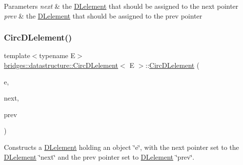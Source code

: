 \begin{DoxyParams}{Parameters}
{\em next} & the \mbox{\hyperlink{classbridges_1_1datastructure_1_1_d_lelement}{D\+Lelement}} that should be assigned to the next pointer \\
\hline
{\em prev} & the \mbox{\hyperlink{classbridges_1_1datastructure_1_1_d_lelement}{D\+Lelement}} that should be assigned to the prev pointer \\
\hline
\end{DoxyParams}
\mbox{\label{classbridges_1_1datastructure_1_1_circ_d_lelement_a52b304df48ac1ba5a13b4c3c596f433b}} 
\subsubsection{\texorpdfstring{CircDLelement()}{CircDLelement()}\hspace{0.1cm}{\footnotesize\ttfamily [4/4]}}
{\footnotesize\ttfamily template$<$typename E$>$ \\
\mbox{\hyperlink{classbridges_1_1datastructure_1_1_circ_d_lelement}{bridges\+::datastructure\+::\+Circ\+D\+Lelement}}$<$ E $>$\+::\mbox{\hyperlink{classbridges_1_1datastructure_1_1_circ_d_lelement}{Circ\+D\+Lelement}} (\begin{DoxyParamCaption}\item[{E}]{e,  }\item[{\mbox{\hyperlink{classbridges_1_1datastructure_1_1_circ_d_lelement}{Circ\+D\+Lelement}}$<$ E $>$}]{next,  }\item[{\mbox{\hyperlink{classbridges_1_1datastructure_1_1_circ_d_lelement}{Circ\+D\+Lelement}}$<$ E $>$}]{prev }\end{DoxyParamCaption})\hspace{0.3cm}{\ttfamily [inline]}}

Constructs a \mbox{\hyperlink{classbridges_1_1datastructure_1_1_d_lelement}{D\+Lelement}} holding an object \char`\"{}e\char`\"{}, with the next pointer set to the \mbox{\hyperlink{classbridges_1_1datastructure_1_1_d_lelement}{D\+Lelement}} \char`\"{}next\char`\"{} and the prev pointer set to \mbox{\hyperlink{classbridges_1_1datastructure_1_1_d_lelement}{D\+Lelement}} \char`\"{}prev\char`\"{}.


